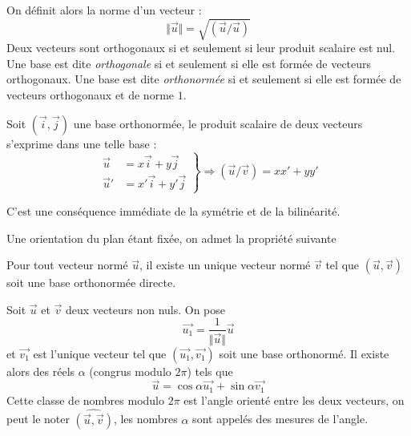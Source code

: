 On définit alors la norme d'un vecteur :
\begin{displaymath}
 \Vert \overrightarrow{u}\Vert = \sqrt{(\overrightarrow{u}/\overrightarrow{u})}
\end{displaymath}
Deux vecteurs sont orthogonaux si et seulement si leur produit scalaire est nul. Une base est dite \emph{orthogonale} si et seulement si elle est formée de vecteurs orthogonaux. Une base est dite \emph{orthonormée} si et seulement si elle est formée de vecteurs orthogonaux et de norme $1$.
\begin{prop}
 Soit $(\overrightarrow i, \overrightarrow j)$ une base orthonormée, le produit scalaire de deux vecteurs s'exprime dans une telle base :
\begin{displaymath}
 \left. 
\begin{aligned}
 \overrightarrow u &= x\overrightarrow i + y\overrightarrow j \\
 \overrightarrow u' &= x'\overrightarrow i + y'\overrightarrow j 
\end{aligned}
\right\rbrace \Rightarrow
(\overrightarrow u / \overrightarrow v) = xx'+yy'
\end{displaymath}
\end{prop}
\begin{demo}
 C'est une conséquence immédiate de la symétrie et de la bilinéarité.
\end{demo}
Une orientation du plan étant fixée, on admet la propriété suivante
\begin{prop}
 Pour tout vecteur normé $\overrightarrow{u}$, il existe un unique vecteur normé $\overrightarrow{v}$ tel que $(\overrightarrow{u},\overrightarrow{v})$ soit une base orthonormée directe.
\end{prop}
\begin{defi}
 Soit $\overrightarrow u$ et $\overrightarrow v$ deux vecteurs non nuls. On pose
\begin{displaymath}
 \overrightarrow{u_1}=\dfrac{1}{\Vert\overrightarrow{u}\Vert}\overrightarrow{u}
\end{displaymath}
et $\overrightarrow{v_1}$ est l'unique vecteur tel que $(\overrightarrow{u_1},\overrightarrow{v_1})$ soit une base orthonormé. Il existe alors des réels $\alpha$ (congrus modulo $2\pi$) tels que
\begin{displaymath}
 \overrightarrow{u} = \cos\alpha \overrightarrow{u_1} + \sin\alpha \overrightarrow{v_1}
\end{displaymath}
Cette classe de nombres modulo $2\pi$ est l'angle orienté entre les deux vecteurs, on peut le noter $\widehat{(\overrightarrow{u},\overrightarrow{v})}$, les nombres $\alpha$ sont appelés des mesures de l'angle.
\end{defi}
